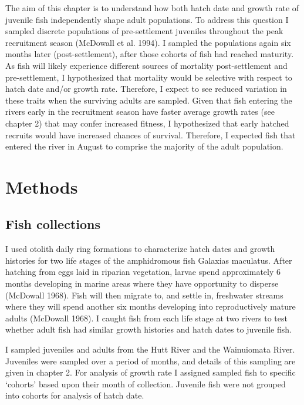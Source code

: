 \documentclass[]{book}
\begin{document}
The aim of this chapter is to understand how both hatch date and growth
rate of juvenile fish independently shape adult populations. To address
this question I sampled discrete populations of pre-settlement juveniles
throughout the peak recruitment season (McDowall et al. 1994). I sampled
the populations again six months later (post-settlement), after those
cohorts of fish had reached maturity. As fish will likely experience
different sources of mortality post-settlement and pre-settlement, I
hypothesized that mortality would be selective with respect to hatch
date and/or growth rate. Therefore, I expect to see reduced variation in
these traits when the surviving adults are sampled. Given that fish
entering the rivers early in the recruitment season have faster average
growth rates (see chapter 2) that may confer increased fitness, I
hypothesized that early hatched recruits would have increased chances of
survival. Therefore, I expected fish that entered the river in August to
comprise the majority of the adult population.

\section{Methods}\label{methods-2}

\subsection{Fish collections}\label{fish-collections-2}

I used otolith daily ring formations to characterize hatch dates and
growth histories for two life stages of the amphidromous fish Galaxias
maculatus. After hatching from eggs laid in riparian vegetation, larvae
spend approximately 6 months developing in marine areas where they have
opportunity to disperse (McDowall 1968). Fish will then migrate to, and
settle in, freshwater streams where they will spend another six months
developing into reproductively mature adults (McDowall 1968). I caught
fish from each life stage at two rivers to test whether adult fish had
similar growth histories and hatch dates to juvenile fish.

I sampled juveniles and adults from the Hutt River and the Wainuiomata
River. Juveniles were sampled over a period of months, and details of
this sampling are given in chapter 2. For analysis of growth rate I
assigned sampled fish to specific `cohorts' based upon their month of
collection. Juvenile fish were not grouped into cohorts for analysis of
hatch date.
\end{document}

